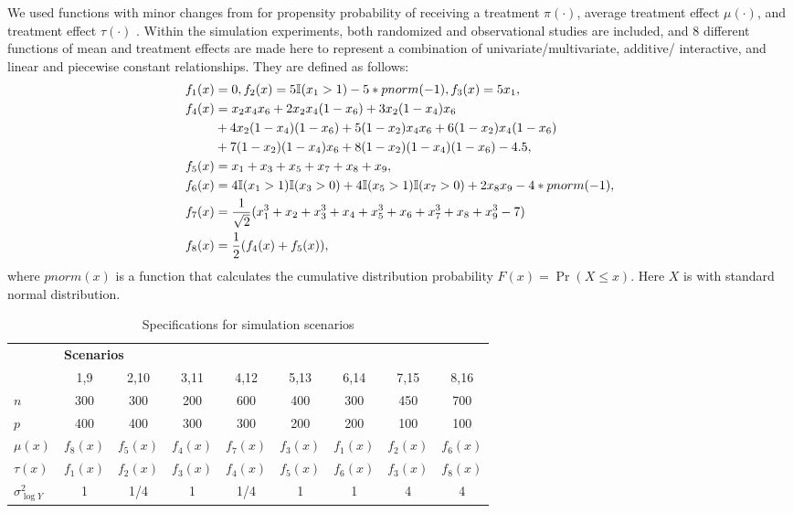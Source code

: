     We used functions with minor changes from \cite{powers2017some} for propensity probability of receiving a treatment $\pi(\cdot)$, average treatment effect $\mu(\cdot)$, and treatment effect $\tau(\cdot)$ . Within the simulation experiments, both randomized and observational studies are included, and 8 different functions of mean and treatment effects are made here to represent a combination of univariate/multivariate, additive/ interactive, and linear and piecewise constant relationships. They are defined as follows:
    \begin{equation*}
      \begin{split}
        f_1(x) & =  0, f_2(x) = 5 \mathbb{I} (x_1 > 1) - 5 * pnorm(-1),  f_3(x) = 5 x_1,\\
        f_4(x) & = x_2 x_4 x_6 + 2 x_2 x_4 (1 - x_6) + 3x_2 (1 - x_4) x_6 \\
        & + 4 x_2 (1 - x_4) (1 - x_6) + 5 (1 - x_2) x_4 x_6 + 6 (1 - x_2) x_4 (1 - x_6)\\
        & + 7 (1 - x_2) (1 - x_4) x_6 + 8 (1 - x_2) (1 - x_4) (1 - x_6) - 4.5, \\
        f_5(x) & = x_1 + x_3 + x_5 + x_7 + x_8 + x_9, \\
        f_6(x) & = 4 \mathbb{I} (x_1 > 1) \mathbb{I} (x_3 > 0) + 4 \mathbb{I} (x_5 > 1) \mathbb{I} (x_7 > 0) + 2 x_8 x_9 - 4 * pnorm(-1), \\
        f_7(x) & = \frac{1}{\sqrt{2}} (x_1^3 + x_2 + x_3^3 + x_4 + x_5^3 + x_6 + x_7^3 + x_8 + x_9^3 - 7) \\
        f_8(x) & = \frac{1}{2} (f_4(x) + f_5(x)),
      \end{split}
    \end{equation*}
    where $pnorm(x)$ is a function that calculates the cumulative distribution probability $F(x) = \Pr(X \leq x)$. Here $X$ is with standard normal distribution. 

    \begin{table}[htbp]
      \centering
      \caption{Specifications for simulation scenarios}
        \begin{tabular}{l|cccccccc}
        \toprule
        \multirow{2}[2]{*}{} & \multicolumn{8}{l}{\textbf{Scenarios}} \\
              & 1,9   & 2,10  & 3,11  & 4,12  & 5,13  & 6,14  & 7,15  & 8,16 \\
        \midrule
        $n$        & 300       & 300       & 200       & 600      & 400      & 300      & 450      & 700 \\
        $p$        & 400       & 400       & 300       & 300      & 200      & 200      & 100      & 100 \\
        $\mu(x)$   & $f_8(x)$  & $f_5(x)$  & $f_4(x)$  & $f_7(x)$ & $f_3(x)$ & $f_1(x)$ & $f_2(x)$ & $f_6(x)$ \\
        $\tau(x)$  & $f_1(x)$  & $f_2(x)$  & $f_3(x)$  & $f_4(x)$ & $f_5(x)$ & $f_6(x)$ & $f_3(x)$ & $f_8(x)$ \\
        $\sigma_{\log Y}^2 $ & 1   & 1/4   & 1         & 1/4      & 1        & 1        & 4        & 4 \\
        \bottomrule
        \end{tabular}%
      \label{tab:ite_scenarios}%
    \end{table}%

